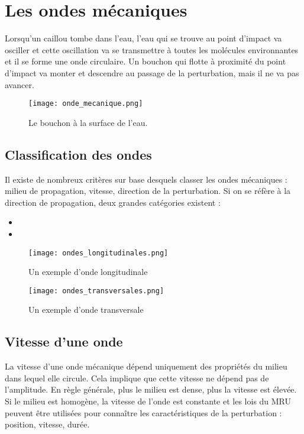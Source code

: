 \chapter{Les ondes mécaniques}
Lorsqu'un caillou tombe dans l'eau, l'eau qui se trouve au point d'impact va osciller et cette oscillation va se transmettre à toutes les molécules environnantes et il se forme une onde circulaire. Un bouchon qui flotte à proximité du point d'impact va monter et descendre au passage de la perturbation, mais il ne va pas avancer.

\begin{figure}[ht!]
    \centering
    \texttt{[image: onde\_mecanique.png]}
    \caption{Le bouchon à la surface de l'eau.}
    \label{onde_mecanique}
\end{figure}

\newpage

\section{Classification des ondes}
Il existe de nombreux critères sur base desquels classer les ondes mécaniques : milieu de propagation, vitesse, direction de la perturbation. Si on se réfère à la direction de propagation, deux grandes catégories existent :
\begin{itemize}[label=\textbullet]
    \item {}
    \item {}
\end{itemize}

\begin{figure}[ht!]
    \centering
    \texttt{[image: ondes\_longitudinales.png]}
    \caption{Un exemple d'onde longitudinale}
    \label{onde_longitudinale}
\end{figure}

\begin{figure}[ht!]
    \centering
    \texttt{[image: ondes\_transversales.png]}
    \caption{Un exemple d'onde transversale}
    \label{onde_transversale}
\end{figure}

\newpage

\section{Vitesse d'une onde}
La vitesse d'une onde mécanique dépend uniquement des propriétés du milieu dans lequel elle circule. Cela implique que cette vitesse ne dépend pas de l'amplitude. En règle générale, plus le milieu est dense, plus la vitesse est élevée.
Si le milieu est homogène, la vitesse de l'onde est constante et les lois du MRU peuvent être utilisées pour connaître les caractéristiques de la perturbation : position, vitesse, durée.

